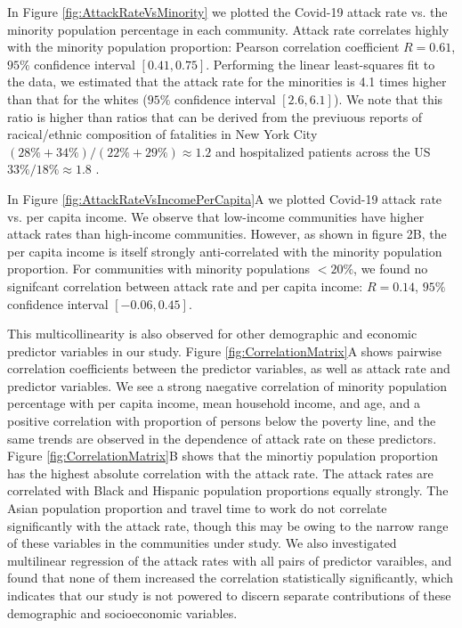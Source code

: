 \documentclass[twoside,12pt,onecolumn]{article}
\begin{document}
In Figure \ref{fig:AttackRateVsMinority} we plotted the Covid-19 attack rate vs. the minority population percentage in each community.
Attack rate correlates highly with the minority population proportion: Pearson correlation coefficient $R=0.61$,
$95\%$ confidence interval $[0.41,0.75]$.
Performing the linear least-squares fit to the data, we estimated that the attack rate for the minorities is 4.1 times higher than that for the whites ($95\%$ confidence interval $[2.6,6.1]$).
We note that this ratio is higher than ratios that can be derived from the previuous reports of racical/ethnic composition of fatalities in New York City
$(28\%+34\%)/(22\%+29\%) \approx 1.2$
\cite{NYS_COVID19_tracker} and hospitalized patients across the US $ 33\%/18\% \approx 1.8 $ \cite{COVID-NET_2020}.

In Figure \ref{fig:AttackRateVsIncomePerCapita}A we plotted Covid-19 attack rate vs. per capita income.
We observe that low-income communities have higher attack rates than high-income communities.
However, as shown in figure 2B, the per capita income is itself strongly anti-correlated with the minority population proportion.
For communities with minority populations $<20\%$, we found no signifcant correlation between attack rate and per capita income: $R=0.14$, $95\%$ confidence interval $[-0.06,0.45]$.

This multicollinearity is also observed for other demographic and economic predictor variables in our study.
Figure \ref{fig:CorrelationMatrix}A shows pairwise correlation coefficients between the predictor variables, as well as attack rate and predictor variables.
We see a strong naegative correlation of minority population percentage with per capita income, mean household income, and age, and a positive correlation with proportion of persons below the poverty line, and the same trends are observed in the dependence of attack rate on these predictors.
Figure \ref{fig:CorrelationMatrix}B shows that the minortiy population proportion has the highest absolute correlation with the attack rate. The attack rates are correlated with Black and Hispanic population proportions equally strongly. The Asian population proportion and travel time to work do not correlate significantly with the attack rate, though this may be owing to the narrow range of these variables in the communities under study.
We also investigated multilinear regression of the attack rates with all pairs of predictor varaibles, and found that none of them increased the correlation statistically significantly, which indicates that our study is not powered to discern separate contributions of these demographic and socioeconomic variables.
\end{document}
